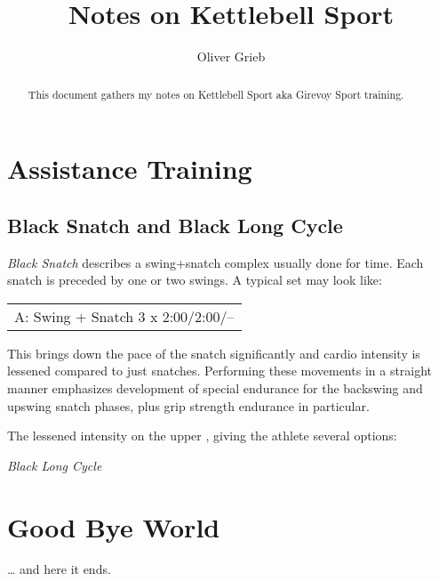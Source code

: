 \documentclass[a4paper,11pt,oneside]{article}
\author{Oliver Grieb}
\title{Notes on Kettlebell Sport}
\begin{document}
\maketitle

\begin{abstract}
This document gathers my notes on Kettlebell Sport aka Girevoy Sport training.
\end{abstract}

\section{Assistance Training}

\subsection{Black Snatch and Black Long Cycle}

\emph{Black Snatch} describes a swing+snatch complex usually done for time. Each snatch is preceded by one or two swings. A typical set may look like:

\begin{tabular}{c}
A: Swing + Snatch 3 x 2:00/2:00/--
\end{tabular}

This brings down the pace of the snatch significantly and cardio intensity is lessened compared to just snatches. Performing these movements in a straight manner emphasizes development of special endurance for the backswing and upswing snatch phases, plus grip strength endurance in particular.

The lessened intensity on the upper 
, giving the athlete several options:


\emph{Black Long Cycle}

\section{Good Bye World}\ldots{} and here it ends.
\end{document}
